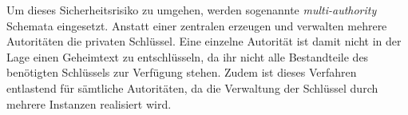 Um dieses Sicherheitsrisiko zu umgehen, werden sogenannte
\textit{multi-authority} Schemata eingesetzt. Anstatt einer zentralen erzeugen
und verwalten mehrere Autoritäten die privaten Schlüssel. Eine einzelne
Autorität ist damit nicht in der Lage einen Geheimtext zu entschlüsseln, da
ihr nicht alle Bestandteile des benötigten Schlüssels zur Verfügung stehen.
Zudem ist dieses Verfahren entlastend für sämtliche Autoritäten, da die
Verwaltung der Schlüssel durch mehrere Instanzen realisiert wird.
